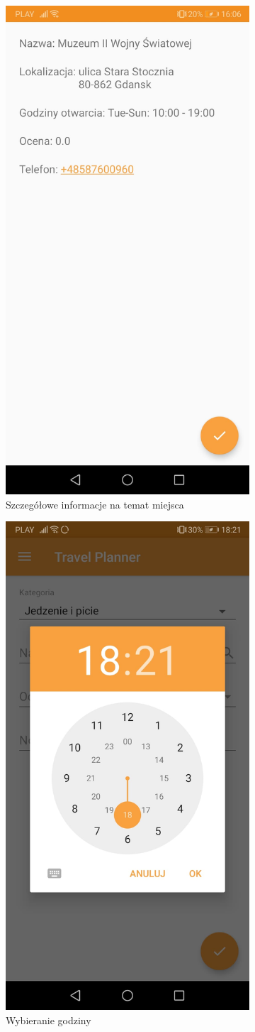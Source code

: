 \documentclass[10pt,twoside,a4paper]{report}
\begin{document}
\begin{figure}[h]
\begin{subfigure}{0.3\textwidth}
\includegraphics[width=0.9\linewidth, width=5cm]{placeDescription}
\caption{Szczegółowe informacje na temat miejsca}
\label{fig:placeDescription}
\end{subfigure}
\begin{subfigure}{0.3\textwidth}
\centering
\includegraphics[width=0.9\linewidth, width=5cm]{clock}
\caption{Wybieranie godziny}
\label{fig:clock}
\end{subfigure}
\begin{subfigure}{0.3\textwidth}
\centering

\end{subfigure}
\end{figure}
\end{document}
